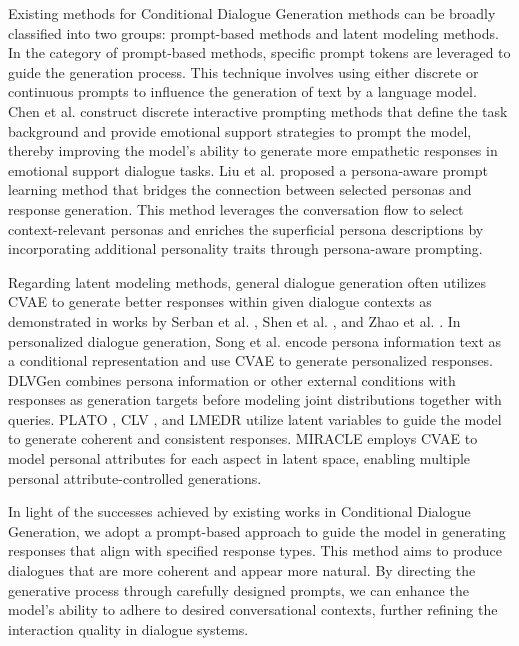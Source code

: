 Existing methods for Conditional Dialogue Generation methods can be broadly classified into two groups: prompt-based methods and latent modeling methods. In the category of prompt-based methods, specific prompt tokens are leveraged to guide the generation process. This technique involves using either discrete \cite{brown-etal-2020-gpt3} or continuous \cite{lester-etal-2021-power} prompts to influence the generation of text by a language model. Chen et al. \cite{chen-etal-2023-controllable} construct discrete interactive prompting methods that define the task background and provide emotional support strategies to prompt the model, thereby improving the model's ability to generate more empathetic responses in emotional support dialogue tasks. Liu et al. \cite{liu-etal-2023-disenttangled} proposed a persona-aware prompt learning method that bridges the connection between selected personas and response generation. This method leverages the conversation flow to select context-relevant personas and enriches the superficial persona descriptions by incorporating additional personality traits through persona-aware prompting.

Regarding latent modeling methods, general dialogue generation often utilizes CVAE to generate better responses within given dialogue contexts as demonstrated in works by Serban et al. \cite{serban-etal-2017-hierarchical}, Shen et al. \cite{shen-etal-2017-conditional}, and Zhao et al. \cite{zhao-etal-2017-learning}. In personalized dialogue generation, Song et al. \cite{song-etal-2019-exploiting} encode persona information text as a conditional representation and use CVAE to generate personalized responses. DLVGen \cite{lee-etal-2021-dlvgen} combines persona information or other external conditions with responses as generation targets before modeling joint distributions together with queries. PLATO \cite{bao-etal-2020-plato} \cite{bao-etal-2021-plato}, CLV \cite{tang-etal-2023-enhancing-personalized}, and LMEDR \cite{chen-etal-2023-memorize} utilize latent variables to guide the model to generate coherent and consistent responses. MIRACLE \cite{lu-etal-2023-miracle} employs CVAE to model personal attributes for each aspect in latent space, enabling multiple personal attribute-controlled generations.

In light of the successes achieved by existing works in Conditional Dialogue Generation, we adopt a prompt-based approach to guide the model in generating responses that align with specified response types. This method aims to produce dialogues that are more coherent and appear more natural. By directing the generative process through carefully designed prompts, we can enhance the model's ability to adhere to desired conversational contexts, further refining the interaction quality in dialogue systems.

\EndChapter
